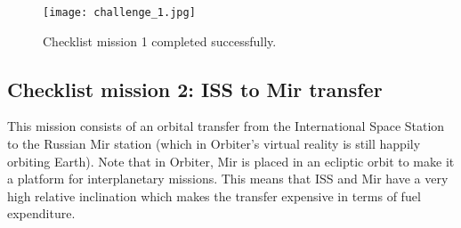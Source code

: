\documentclass[Orbiter User Manual.tex]{subfiles}
\begin{document}
\begin{figure}[H]
	\centering
	\texttt{[image: challenge\_1.jpg]}
	\caption{Checklist mission 1 completed successfully.}
\end{figure}


\subsection{Checklist mission 2: ISS to Mir transfer}
This mission consists of an orbital transfer from the International Space Station to the Russian Mir station (which in Orbiter's virtual reality is still happily orbiting Earth). Note that in Orbiter, Mir is placed in an ecliptic orbit to make it a platform for interplanetary missions. This means that ISS and Mir have a very high relative inclination which makes the transfer expensive in terms of fuel expenditure.
\end{document}
